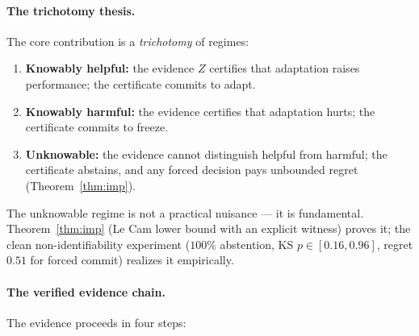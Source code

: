 \paragraph{The trichotomy thesis.}
The core contribution is a \emph{trichotomy} of regimes:
\begin{enumerate}
\item \textbf{Knowably helpful:} the evidence $Z$ certifies that adaptation raises
  performance; the certificate commits to adapt.
\item \textbf{Knowably harmful:} the evidence certifies that adaptation hurts; the
  certificate commits to freeze.
\item \textbf{Unknowable:} the evidence cannot distinguish helpful from harmful;
  the certificate abstains, and any forced decision pays unbounded regret
  (Theorem~\ref{thm:imp}).
\end{enumerate}
The unknowable regime is not a practical nuisance --- it is fundamental.
Theorem~\ref{thm:imp} (Le Cam lower bound with an explicit witness) proves it;
the clean non-identifiability experiment ($100\%$ abstention, KS $p \in [0.16,
0.96]$, regret $0.51$ for forced commit) realizes it empirically.

\paragraph{The verified evidence chain.}
The evidence proceeds in four steps:

